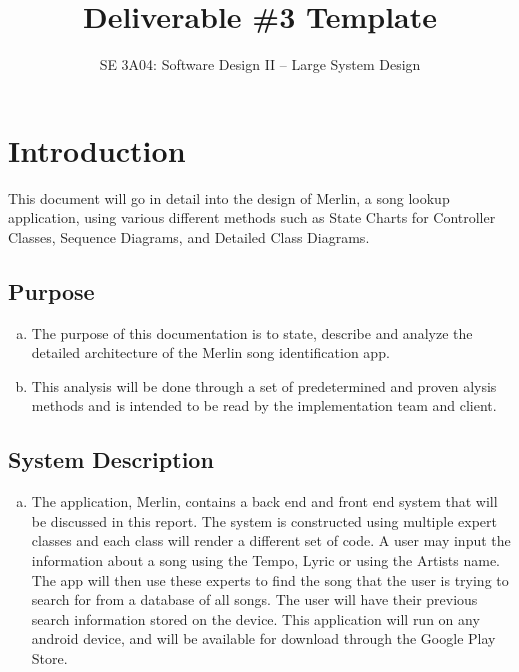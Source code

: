 \documentclass[]{article}
\title{Deliverable \#3 Template}
\author{SE 3A04: Software Design II -- Large System Design}
\date{}
\begin{document}
\maketitle	

\section{Introduction}
\label{sec:introduction}

This document will go in detail into the design of Merlin, a song lookup application, using various different methods such as State Charts for Controller Classes, Sequence Diagrams, and Detailed Class Diagrams.

\subsection{Purpose}
\label{sub:purpose}
\begin{enumerate}[a)]
	\item The purpose of this documentation is to state, describe and analyze the detailed architecture of the Merlin song identification app. 
	\item This analysis will be done through a set of predetermined and proven alysis methods and is intended to be read by the implementation team and client.
\end{enumerate}

\subsection{System Description}
\label{sub:system_description}
\begin{enumerate}[a)]
	\item The application, Merlin, contains a back end and front end system that will be discussed in this report. The system is constructed using multiple expert classes and each class will render a different set of code. A user may input the information about a song using the Tempo, Lyric or using the Artists name. The app will then use these experts to find the song that the user is trying to search for from a database of all songs. The user will have their previous search information stored on the device. This application will run on any android device, and will be available for download through the Google Play Store.
\end{enumerate}
\end{document}
